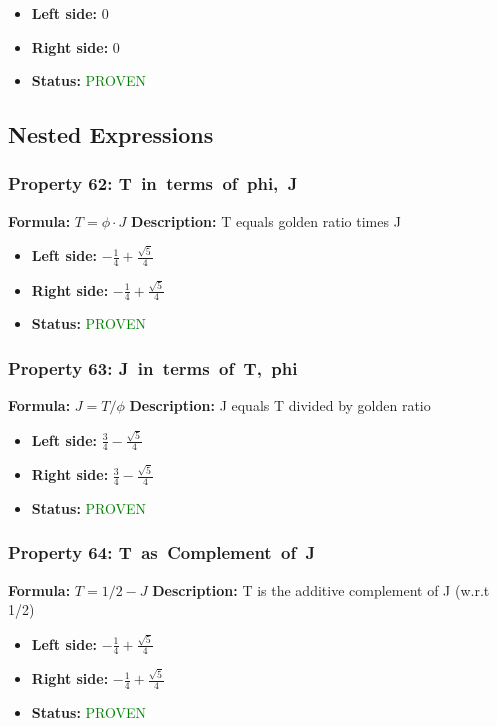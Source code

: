 \begin{itemize}
\item \textbf{Left side:} $0$
\item \textbf{Right side:} $0$
\item \textbf{Status:} \textcolor{green}{PROVEN}
\end{itemize}


\subsection{Nested Expressions}

\subsubsection*{Property 62: T~in~terms~of~phi,~J}
\textbf{Formula:} $T = \phi \cdot J$
\textbf{Description:} T equals golden ratio times J

\begin{itemize}
\item \textbf{Left side:} $- \frac{1}{4} + \frac{\sqrt{5}}{4}$
\item \textbf{Right side:} $- \frac{1}{4} + \frac{\sqrt{5}}{4}$
\item \textbf{Status:} \textcolor{green}{PROVEN}
\end{itemize}

\subsubsection*{Property 63: J~in~terms~of~T,~phi}
\textbf{Formula:} $J = T/\phi$
\textbf{Description:} J equals T divided by golden ratio

\begin{itemize}
\item \textbf{Left side:} $\frac{3}{4} - \frac{\sqrt{5}}{4}$
\item \textbf{Right side:} $\frac{3}{4} - \frac{\sqrt{5}}{4}$
\item \textbf{Status:} \textcolor{green}{PROVEN}
\end{itemize}

\subsubsection*{Property 64: T~as~Complement~of~J}
\textbf{Formula:} $T = 1/2 - J$
\textbf{Description:} T is the additive complement of J (w.r.t 1/2)

\begin{itemize}
\item \textbf{Left side:} $- \frac{1}{4} + \frac{\sqrt{5}}{4}$
\item \textbf{Right side:} $- \frac{1}{4} + \frac{\sqrt{5}}{4}$
\item \textbf{Status:} \textcolor{green}{PROVEN}
\end{itemize}


